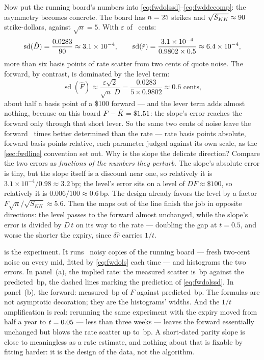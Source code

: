 Now put the running board's numbers into
\eqref{eq:fwdolssd}--\eqref{eq:fwddecomp}: the asymmetry becomes
concrete.  The board has $n=25$ strikes
and $\sqrt{S_{KK}}\approx90$ strike-dollars, against
$\sqrt n=5$.  With $\varepsilon$ of \MacFwdIdentEpsCents\ cents:
\[
\operatorname{sd}(\hat D)
=\frac{0.0283}{90}
\approx3.1\times10^{-4},
\qquad
\operatorname{sd}(\hat r)
=\frac{3.1\times10^{-4}}{0.9802\times0.5}
\approx6.4\times10^{-4},
\]
more than six basis points of rate scatter from two cents of quote
noise.  The forward, by contrast, is dominated by the level term:
\[
\operatorname{sd}(\hat F)
\approx\frac{\varepsilon\sqrt2}{\sqrt n\;D}
=\frac{0.0283}{5\times0.9802}
\approx0.6\text{ cents},
\]
about half a basis point of a \$100 forward --- and the lever term
adds almost nothing, because on this board
$F-\bar K=\$1.51$: the slope's error reaches the
forward only through that short lever.  So the same two cents of
noise leave the forward \MacFwdIdentRatio\ times better determined
than the rate --- rate basis points absolute, forward basis points
relative, each parameter judged against its own scale, as the
\cref{sec:fwdline} convention set out.  Why is the slope the delicate
direction?  Compare the two errors as \emph{fractions of the numbers
they perturb}.  The slope's absolute error is tiny, but the slope
itself is a discount near one, so relatively it is
$3.1\times10^{-4}/0.98\approx3.2$\,bp; the level's error sits on a
level of $DF\approx\$100$, so relatively it is
$0.006/100\approx0.6$\,bp.  The design already favors the level by a
factor $F\sqrt n/\sqrt{S_{KK}}\approx5.6$.  Then the maps out of the
line finish the job in opposite directions: the level passes to the
forward almost unchanged, while the slope's error is divided by
$D\,t$ on its way to the rate --- doubling the gap at $t=0.5$, and
worse the shorter the expiry, since $\delta\hat r$ carries $1/t$.

 is the experiment.  It runs \MacFwdIdentTrials\ noisy
copies of the running board --- fresh two-cent noise on every mid,
fitted by \eqref{eq:fwdols} each time --- and histograms the two
errors.  In panel~(a), the implied rate: the measured scatter is
\MacFwdIdentRateSdBp\,bp against the predicted
\MacFwdIdentRatePredBp\,bp, the dashed lines marking the prediction of
\eqref{eq:fwdolssd}.  In panel~(b), the forward: measured
\MacFwdIdentFwdSdBp\,bp of $F$ against predicted
\MacFwdIdentFwdPredBp\,bp.  The formulas are not asymptotic decoration;
they are the histograms' widths.  And the $1/t$ amplification is real:
rerunning the same experiment with the expiry moved from half a year
to $t=0.05$ --- less than three weeks --- leaves the
forward essentially unchanged but blows the rate scatter up to
\MacFwdIdentShortRateSdBp\,bp.  A short-dated parity slope is close to
meaningless as a rate estimate, and nothing about that is fixable by
fitting harder: it is the design of the data, not the algorithm.

